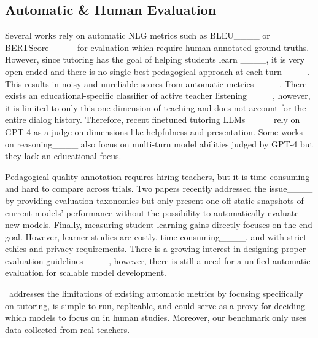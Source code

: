 \subsection{Automatic \& Human Evaluation}
Several works rely on automatic NLG metrics %
such as BLEU____ or BERTScore____ for evaluation which require human-annotated ground truths. However, since tutoring has the goal of helping students learn %
____, it is %
very open-ended and there is no single best pedagogical approach at each turn____. This results in noisy and unreliable scores from automatic metrics____. There exists an educational-specific classifier of active teacher listening____, however, it is limited to only this one dimension of teaching and does not account for the entire dialog history.
Therefore, recent finetuned tutoring LLMs____ rely on GPT-4-as-a-judge on dimensions like helpfulness and presentation. Some works on reasoning____ also focus on multi-turn model abilities judged by GPT-4 but they lack an educational focus. %


Pedagogical quality annotation requires hiring teachers, but it is time-consuming and hard to compare across trials. Two papers recently addressed the issue____ by providing evaluation taxonomies but only present one-off static snapshots of current models' performance without the possibility to automatically evaluate new models. 
Finally, measuring student learning gains directly focuses on the end goal. However, learner studies are costly, time-consuming____, and with strict ethics and privacy requirements. There is a growing interest in designing proper evaluation guidelines____, however, there is still a need for a unified automatic evaluation for scalable model development. 

\mathtutorbench\ addresses the limitations of existing automatic metrics by focusing specifically on tutoring, is simple to run, replicable, and could serve as a proxy for deciding which models to focus on in human studies. Moreover, our benchmark only uses data collected from real teachers.




